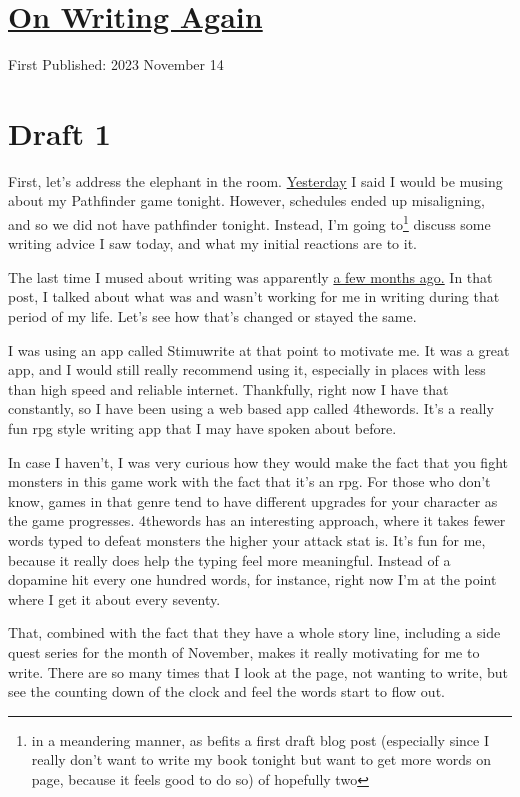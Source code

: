 \documentclass[12pt]{article}[titlepage]
\newcommand{\1}{\={a}}
\newcommand{\2}{\={e}}
\newcommand{\3}{\={\i}}
\newcommand{\4}{\=o}
\newcommand{\5}{\=u}
\newcommand{\6}{\={A}}
\renewcommand{\,}{\textsuperscript{,}}
\begin{document}
\doublespacing
\section{\href{writing-7.html}{On Writing Again}}
First Published: 2023 November 14

\section{Draft 1}
First, let's address the elephant in the room.
\href{dungeons-dragons-6.html}{Yesterday} I said I would be musing about my Pathfinder game tonight.
However, schedules ended up misaligning, and so we did not have pathfinder tonight.
Instead, I'm going to\footnote{in a meandering manner, as befits a first draft blog post (especially since I really don't want to write my book tonight but want to get more words on page, because it feels good to do so) of hopefully two} discuss some writing advice I saw today, and what my initial reactions are to it.

The last time I mused about writing was apparently \href{writing-6.html}{a few months ago.}
In that post, I talked about what was and wasn't working for me in writing during that period of my life.
Let's see how that's changed or stayed the same.

I was using an app called Stimuwrite at that point to motivate me.
It was a great app, and I would still really recommend using it, especially in places with less than high speed and reliable internet.
Thankfully, right now I have that constantly, so I have been using a web based app called 4thewords.
It's a really fun rpg style writing app that I may have spoken about before.

In case I haven't, I was very curious how they would make the fact that you fight monsters in this game work with the fact that it's an rpg.
For those who don't know, games in that genre tend to have different upgrades for your character as the game progresses.
4thewords has an interesting approach, where it takes fewer words typed to defeat monsters the higher your attack stat is.
It's fun for me, because it really does help the typing feel more meaningful.
Instead of a dopamine hit every one hundred words, for instance, right now I'm at the point where I get it about every seventy.

That, combined with the fact that they have a whole story line, including a side quest series for the month of November, makes it really motivating for me to write.
There are so many times that I look at the page, not wanting to write, but see the counting down of the clock and feel the words start to flow out.
\end{document}
